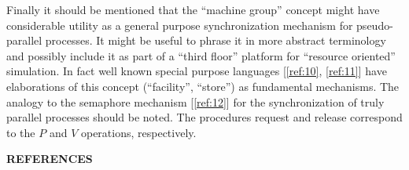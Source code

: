 \documentclass[twoside,11pt]{book}
\begin{document}
Finally it should be mentioned that the ``machine group'' concept might have considerable utility as a general purpose synchronization mechanism for pseudo-parallel processes. It might be useful to phrase it in more abstract terminology and possibly include it as part of a ``third floor'' platform for ``resource oriented'' simulation. In fact well known special purpose languages [\ref{ref:10}, \ref{ref:11}] have elaborations of this concept (``facility'', ``store'') as fundamental mechanisms. The analogy to the semaphore mechanism [\ref{ref:12}] for the synchronization of truly parallel processes should be noted. The procedures request and release correspond to the $P$ and $V$ operations, respectively.

\bigskip

\noindent
\textbf{REFERENCES}
\medskip\nopagebreak
\end{document}
